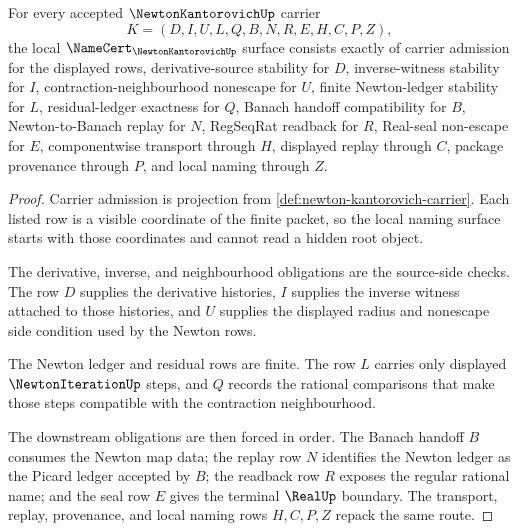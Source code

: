 
\begin{theorem}
\label{thm:newton-kantorovich-namecert-obligations}
For every accepted $\NewtonKantorovichUp$ carrier
$$
K=(D,I,U,L,Q,B,N,R,E,H,C,P,Z),
$$
the local $\NameCert_{\NewtonKantorovichUp}$ surface consists exactly of carrier admission for the displayed rows, derivative-source stability for $D$, inverse-witness stability for $I$, contraction-neighbourhood nonescape for $U$, finite Newton-ledger stability for $L$, residual-ledger exactness for $Q$, Banach handoff compatibility for $B$, Newton-to-Banach replay for $N$, RegSeqRat readback for $R$, Real-seal non-escape for $E$, componentwise transport through $H$, displayed replay through $C$, package provenance through $P$, and local naming through $Z$.
\end{theorem}
\begin{proof}
Carrier admission is projection from \autoref{def:newton-kantorovich-carrier}. Each listed row is a visible coordinate of the finite packet, so the local naming surface starts with those coordinates and cannot read a hidden root object.

The derivative, inverse, and neighbourhood obligations are the source-side checks. The row $D$ supplies the derivative histories, $I$ supplies the inverse witness attached to those histories, and $U$ supplies the displayed radius and nonescape side condition used by the Newton rows.

The Newton ledger and residual rows are finite. The row $L$ carries only displayed $\NewtonIterationUp$ steps, and $Q$ records the rational comparisons that make those steps compatible with the contraction neighbourhood.

The downstream obligations are then forced in order. The Banach handoff $B$ consumes the Newton map data; the replay row $N$ identifies the Newton ledger as the Picard ledger accepted by $B$; the readback row $R$ exposes the regular rational name; and the seal row $E$ gives the terminal $\RealUp$ boundary. The transport, replay, provenance, and local naming rows $H,C,P,Z$ repack the same route.
\end{proof}

